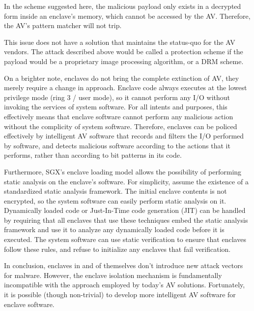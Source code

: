 In the scheme suggested here, the malicious payload only exists in a decrypted
form inside an enclave's memory, which cannot be accessed by the AV. Therefore,
the AV's pattern matcher will not trip.

This issue does not have a solution that maintains the status-quo for the AV
vendors. The attack described above would be called a protection scheme if the
payload would be a proprietary image processing algorithm, or a DRM scheme.

On a brighter note, enclaves do not bring the complete extinction of AV, they
merely require a change in approach. Enclave code always executes at the lowest
privilege mode (ring 3 / user mode), so it cannot perform any I/O without
invoking the services of system software. For all intents and purposes, this
effectively means that enclave software cannot perform any malicious action
without the complicity of system software. Therefore, enclaves can be policed
effectively by intelligent AV software that records and filters the I/O
performed by software, and detects malicious software according to the actions
that it performs, rather than according to bit patterns in its code.

Furthermore, SGX's enclave loading model allows the possibility of performing
static analysis on the enclave's software. For simplicity, assume the existence
of a standardized static analysis framework.  The initial enclave contents is
not encrypted, so the system software can easily perform static analysis on it.
Dynamically loaded code or Just-In-Time code generation (JIT) can be handled by
requiring that all enclaves that use these techniques embed the static analysis
framework and use it to analyze any dynamically loaded code before it is
executed. The system software can use static verification to ensure that
enclaves follow these rules, and refuse to initialize any enclaves that fail
verification.

In conclusion, enclaves in and of themselves don't introduce new attack vectors
for malware. However, the enclave isolation mechanism is fundamentally
incompatible with the approach employed by today's AV solutions. Fortunately,
it is possible (though non-trivial) to develop more intelligent AV software for
enclave software.
